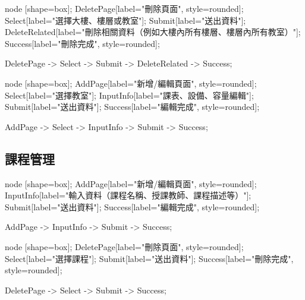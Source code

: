 \documentclass{article}
\begin{document}
\begin{center}

	 {
		node [shape=box];
		DeletePage[label="刪除頁面", style=rounded];
		Select[label="選擇大樓、樓層或教室"];
		Submit[label="送出資料"];
		DeleteRelated[label="刪除相關資料（例如大樓內所有樓層、樓層內所有教室）"];
		Success[label="刪除完成", style=rounded];

		DeletePage -> Select -> Submit -> DeleteRelated -> Success;
	}
\end{center}


\pagebreak


\begin{center}

	 {
		node [shape=box];
		AddPage[label="新增/編輯頁面", style=rounded];
		Select[label="選擇教室"];
		InputInfo[label="課表、設備、容量編輯"];
		Submit[label="送出資料"];
		Success[label="編輯完成", style=rounded];

		AddPage -> Select -> InputInfo -> Submit -> Success;
	}
\end{center}

\pagebreak

\subsection{課程管理}

\begin{center}

	 {
		node [shape=box];
		AddPage[label="新增/編輯頁面", style=rounded];
		InputInfo[label="輸入資料（課程名稱、授課教師、課程描述等）"];
		Submit[label="送出資料"];
		Success[label="編輯完成", style=rounded];

		AddPage -> InputInfo -> Submit -> Success;
	}
\end{center}

\begin{center}

	 {
		node [shape=box];
		DeletePage[label="刪除頁面", style=rounded];
		Select[label="選擇課程"];
		Submit[label="送出資料"];
		Success[label="刪除完成", style=rounded];

		DeletePage -> Select -> Submit -> Success;
	}
\end{center}
\end{document}
